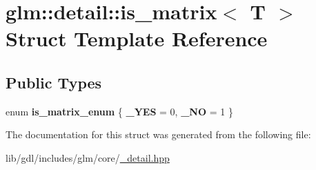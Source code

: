 \hypertarget{structglm_1_1detail_1_1is__matrix}{}\section{glm\+:\+:detail\+:\+:is\+\_\+matrix$<$ T $>$ Struct Template Reference}
\label{structglm_1_1detail_1_1is__matrix}
\subsection*{Public Types}
\begin{DoxyCompactItemize}
\item 
\hypertarget{structglm_1_1detail_1_1is__matrix_a83e986c8972ef020969eae60fcd3c377}{}enum {\bfseries is\+\_\+matrix\+\_\+enum} \{ {\bfseries \+\_\+\+Y\+E\+S} = 0, 
{\bfseries \+\_\+\+N\+O} = 1
 \}\label{structglm_1_1detail_1_1is__matrix_a83e986c8972ef020969eae60fcd3c377}

\end{DoxyCompactItemize}


The documentation for this struct was generated from the following file\+:\begin{DoxyCompactItemize}
\item 
lib/gdl/includes/glm/core/\hyperlink{__detail_8hpp}{\+\_\+detail.\+hpp}\end{DoxyCompactItemize}
